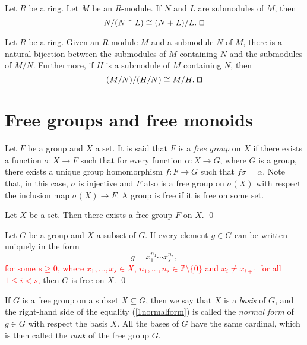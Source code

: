 \begin{theorem}
Let $R$ be a ring.	Let $M$ be an $R$-module. If $N$ and $L$ are submodules of $M$, then 
	$$N/(N\cap L)\cong (N+L)/L. \; \qed$$  
\end{theorem}

\begin{theorem} 
Let $R$ be a ring. Given an $R$-module $M$ and a submodule $N$ of $M$, there is a natural bijection between the submodules of $M$ containing $N$ and the submodules of $M/N$. 
Furthermore, if $H$ is a submodule of $M$ containing $N$, then
\[
(M/N)/(H/N)\cong M/H.\; \qed
\]
\end{theorem}

\section{Free groups and free monoids}

Let $F$ be a group and $X$ a set. It is said that $F$ is a \emph{free group} 
on $X$ if there exists a function
$\sigma\colon X\rightarrow F$ such that for every function $\alpha\colon X\rightarrow G$, where $G$ is a group, there exists 
a unique group homomorphism $f\colon F\rightarrow G$ such that $f\sigma=\alpha$. Note that, in this case, 
$\sigma$ is injective and $F$ also is a free group on $\sigma(X)$ with respect the inclusion map $\sigma(X)\rightarrow F$.
A group is free if it is free on some set.

\begin{theorem}
    Let $X$ be a set. Then there exists a free group $F$ on $X$. \qed
\end{theorem}

\begin{proposition}
    Let $G$ be a group and $X$ a subset of $G$. If every element $g\in G$ can be written uniquely in the form
    \begin{equation}\label{1normalform}
    g=x_1^{n_1}\cdots x_s^{n_s},
    \end{equation}
    \textcolor{red}{
    for some $s\geq 0$, 
    where $x_1,\dots,x_s\in X$, $n_1,\dots,n_s\in \mathbb{Z}\setminus \{0\}$ and $x_i\neq x_{i+1}$ for all $1\leq i<s$,} 
    then $G$ is free on $X$. \qed
\end{proposition}

If $G$ is a free group on a subset $X\subseteq G$, 
then we say that $X$ is a {\em basis} of $G$, and the 
right-hand side of the equality (\ref{1normalform}) is called the {\em normal form} 
of $g\in G$ with respect the basis $X$. All the bases 
of $G$ have the same cardinal,
which is then called the {\em rank} of the free group $G$.

